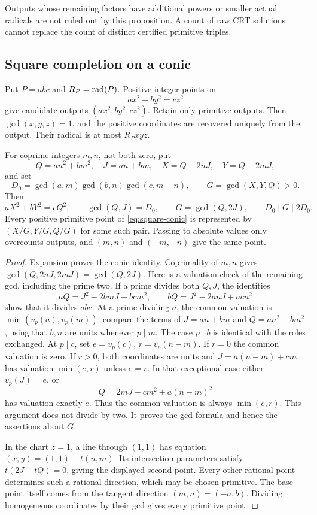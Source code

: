 Outputs whose remaining factors have additional powers or smaller actual
radicals are not ruled out by this proposition. A count of raw CRT
solutions cannot replace the count of distinct certified primitive triples.

\subsection{Square completion on a conic}
Put $P=abc$ and $R_P=\operatorname{rad}(P)$. Positive integer points on
\begin{equation}\label{eq:square-conic}
 ax^2+by^2=cz^2
\end{equation}
give candidate outputs $(ax^2,by^2,cz^2)$. Retain only primitive outputs.
Then $\gcd(x,y,z)=1$, and the positive coordinates are recovered uniquely
from the output. Their radical is at most $R_Pxyz$.

\begin{lemma}\label{lem:conic-parameters}
For coprime integers $m,n$, not both zero, put
\[
 Q=an^2+bm^2,\quad J=an+bm,\quad
 X=Q-2nJ,\quad Y=Q-2mJ,
\]
and set
\[
 D_0=\gcd(a,m)\gcd(b,n)\gcd(c,m-n),\qquad G=\gcd(X,Y,Q)>0.
\]
Then
\[
 aX^2+bY^2=cQ^2,\qquad
 \gcd(Q,J)=D_0,\qquad G=\gcd(Q,2J),\qquad D_0\mid G\mid2D_0.
\]
Every positive primitive point of \eqref{eq:square-conic} is represented
by $(X/G,Y/G,Q/G)$ for some such pair. Passing to absolute values only
overcounts outputs, and $(m,n)$ and $(-m,-n)$ give the same point.
\end{lemma}
\begin{proof}
Expansion proves the conic identity. Coprimality of $m,n$ gives
$\gcd(Q,2nJ,2mJ)=\gcd(Q,2J)$.
Here is a valuation check of the remaining gcd, including the prime two.
If a prime divides both $Q,J$, the identities
\[
 aQ=J^2-2bmJ+bc m^2,\qquad bQ=J^2-2anJ+ac n^2
\]
show that it divides $abc$. At a prime dividing $a$, the common valuation
is $\min(v_p(a),v_p(m))$: compare the terms of $J=an+bm$ and
$Q=an^2+bm^2$, using that $b,n$ are units whenever $p\mid m$.
The case $p\mid b$ is identical with the roles exchanged.
At $p\mid c$, set $e=v_p(c)$, $r=v_p(n-m)$. If $r=0$ the common
valuation is zero. If $r>0$, both coordinates are units and
$J=a(n-m)+cm$ has valuation $\min(e,r)$ unless $e=r$.
In that exceptional case either $v_p(J)=e$, or
\[
 Q=2mJ-cm^2+a(n-m)^2
\]
has valuation exactly $e$. Thus the common valuation is always
$\min(e,r)$. This argument does not divide by two. It proves the gcd
formula and hence the assertions about $G$.

In the chart $z=1$, a line through $(1,1)$ has equation
$(x,y)=(1,1)+t(n,m)$. Its intersection parameters satisfy
$t(2J+tQ)=0$, giving the displayed second point. Every other rational
point determines such a rational direction, which may be chosen primitive.
The base point itself comes from the tangent direction $(m,n)=(-a,b)$.
Dividing homogeneous coordinates by their gcd gives every primitive point.
\end{proof}

